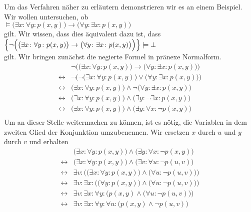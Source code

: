 Um das Verfahren n\"{a}her zu erl\"{a}utern demonstrieren wir es an einem Beispiel. 
Wir wollen untersuchen, ob \\[0.2cm]
\hspace*{1.3cm} 
$\models \big(\exists x\colon \forall y\colon  p(x,y)\big) \rightarrow \big(\forall y\colon \exists x\colon p(x,y)\big)$ \\[0.2cm]
gilt.  Wir wissen, dass dies \"{a}quivalent dazu ist, dass  \\[0.2cm]
\hspace*{1.3cm} 
$\Big\{ \neg \Big(\big(\exists x\colon \forall y\colon  p(x,y)\big) \rightarrow  \big(\forall y\colon \exists x\colon p(x,y)\big)\Big)\Big\} \models \bot$ \\[0.2cm]
gilt.  Wir bringen zun\"{a}chst die negierte Formel in pr\"{a}nexe Normalform. 
$$
\begin{array}{ll}
                  & \neg \Big(\big(\exists x\colon \forall y\colon  p(x,y)\big) \rightarrow \big(\forall y\colon \exists x\colon p(x,y)\big)\Big) \\
  \leftrightarrow & \neg \Big(\neg \big(\exists x\colon \forall y\colon  p(x,y)\big) \vee \big(\forall y\colon \exists x\colon p(x,y)\big)\Big) \\
  \leftrightarrow &                \big(\exists x\colon \forall y\colon  p(x,y)\big) \wedge \neg \big(\forall y\colon \exists x\colon p(x,y)\big) \\
  \leftrightarrow &\big(\exists x\colon \forall y\colon  p(x,y)\big) \wedge  \big(\exists y\colon  \neg \exists x\colon p(x,y)\big) \\
  \leftrightarrow &\big(\exists x\colon \forall y\colon  p(x,y)\big) \wedge  \big(\exists y\colon  \forall x\colon \neg p(x,y)\big) \\
\end{array}
$$
Um an dieser Stelle weitermachen zu k\"{o}nnen, ist es n\"{o}tig, die Variablen in dem  zweiten
Glied der Konjunktion umzubenennen.  Wir ersetzen $x$ durch $u$ und $y$ durch $v$ und erhalten
$$
\begin{array}{ll}
                  &\big(\exists x\colon \forall y\colon  p(x,y)\big) \wedge  \big(\exists y\colon  \forall x\colon \neg p(x,y)\big) \\
  \leftrightarrow &\big(\exists x\colon \forall y\colon  p(x,y)\big) \wedge  \big(\exists v\colon  \forall u\colon \neg p(u,v)\big) \\
  \leftrightarrow &\exists v\colon  \Big( \big(\exists x\colon \forall y\colon  p(x,y)\big) \wedge  \big(\forall u\colon \neg p(u,v)\big) \Big)\\
  \leftrightarrow &\exists v\colon  \exists x\colon  \Big( \big(\forall y\colon  p(x,y)\big) \wedge \big(\forall u\colon \neg p(u,v)\big) \Big)\\
  \leftrightarrow &\exists v\colon  \exists x\colon \forall y\colon \Big( p(x,y) \wedge \big(\forall u\colon \neg p(u,v)\big) \Big)\\
  \leftrightarrow &\exists v\colon  \exists x\colon \forall y\colon \forall u\colon \Big( p(x,y) \wedge \neg p(u,v) \Big)\\
\end{array}
$$
